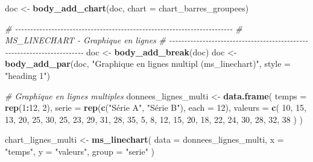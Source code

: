 \documentclass[
]{article}
\newenvironment{Shaded}{\begin{snugshade}}{\end{snugshade}}
\newcommand{\AttributeTok}[1]{\textcolor[rgb]{0.13,0.29,0.53}{#1}}
\newcommand{\CommentTok}[1]{\textcolor[rgb]{0.56,0.35,0.01}{\textit{#1}}}
\newcommand{\DecValTok}[1]{\textcolor[rgb]{0.00,0.00,0.81}{#1}}
\newcommand{\FunctionTok}[1]{\textcolor[rgb]{0.13,0.29,0.53}{\textbf{#1}}}
\newcommand{\NormalTok}[1]{#1}
\newcommand{\OtherTok}[1]{\textcolor[rgb]{0.56,0.35,0.01}{#1}}
\newcommand{\SpecialCharTok}[1]{\textcolor[rgb]{0.81,0.36,0.00}{\textbf{#1}}}
\newcommand{\StringTok}[1]{\textcolor[rgb]{0.31,0.60,0.02}{#1}}
\begin{document}
\begin{Shaded}
\begin{Highlighting}[]
\NormalTok{doc }\OtherTok{\textless{}{-}} \FunctionTok{body\_add\_chart}\NormalTok{(doc, }\AttributeTok{chart =}\NormalTok{ chart\_barres\_groupees)}

\CommentTok{\# {-}{-}{-}{-}{-}{-}{-}{-}{-}{-}{-}{-}{-}{-}{-}{-}{-}{-}{-}{-}{-}{-}{-}{-}{-}{-}{-}{-}{-}{-}{-}{-}{-}{-}{-}{-}{-}{-}{-}{-}{-}{-}{-}{-}{-}{-}{-}{-}{-}{-}{-}{-}{-}{-}{-}{-}{-}{-}{-}{-}{-}{-}{-}{-}{-}{-}{-}{-}{-}{-}{-}{-}}
\CommentTok{\# MS\_LINECHART {-} Graphique en lignes}
\CommentTok{\# {-}{-}{-}{-}{-}{-}{-}{-}{-}{-}{-}{-}{-}{-}{-}{-}{-}{-}{-}{-}{-}{-}{-}{-}{-}{-}{-}{-}{-}{-}{-}{-}{-}{-}{-}{-}{-}{-}{-}{-}{-}{-}{-}{-}{-}{-}{-}{-}{-}{-}{-}{-}{-}{-}{-}{-}{-}{-}{-}{-}{-}{-}{-}{-}{-}{-}{-}{-}{-}{-}{-}{-}}
\NormalTok{doc }\OtherTok{\textless{}{-}} \FunctionTok{body\_add\_break}\NormalTok{(doc)}
\NormalTok{doc }\OtherTok{\textless{}{-}} \FunctionTok{body\_add\_par}\NormalTok{(doc, }\StringTok{"Graphique en lignes multipl (ms\_linechart)"}\NormalTok{, }\AttributeTok{style =} \StringTok{"heading 1"}\NormalTok{)}

\CommentTok{\# Graphique en lignes multiples}
\NormalTok{donnees\_lignes\_multi }\OtherTok{\textless{}{-}} \FunctionTok{data.frame}\NormalTok{(}
  \AttributeTok{temps =} \FunctionTok{rep}\NormalTok{(}\DecValTok{1}\SpecialCharTok{:}\DecValTok{12}\NormalTok{, }\DecValTok{2}\NormalTok{),}
  \AttributeTok{serie =} \FunctionTok{rep}\NormalTok{(}\FunctionTok{c}\NormalTok{(}\StringTok{"Série A"}\NormalTok{, }\StringTok{"Série B"}\NormalTok{), }\AttributeTok{each =} \DecValTok{12}\NormalTok{),}
  \AttributeTok{valeurs =} \FunctionTok{c}\NormalTok{(}
    \DecValTok{10}\NormalTok{, }\DecValTok{15}\NormalTok{, }\DecValTok{13}\NormalTok{, }\DecValTok{20}\NormalTok{, }\DecValTok{25}\NormalTok{, }\DecValTok{30}\NormalTok{, }\DecValTok{25}\NormalTok{, }\DecValTok{23}\NormalTok{, }\DecValTok{29}\NormalTok{, }\DecValTok{31}\NormalTok{, }\DecValTok{28}\NormalTok{, }\DecValTok{35}\NormalTok{,}
    \DecValTok{5}\NormalTok{, }\DecValTok{8}\NormalTok{, }\DecValTok{12}\NormalTok{, }\DecValTok{15}\NormalTok{, }\DecValTok{20}\NormalTok{, }\DecValTok{18}\NormalTok{, }\DecValTok{22}\NormalTok{, }\DecValTok{24}\NormalTok{, }\DecValTok{30}\NormalTok{, }\DecValTok{28}\NormalTok{, }\DecValTok{32}\NormalTok{, }\DecValTok{38}
\NormalTok{  )}
\NormalTok{)}

\NormalTok{chart\_lignes\_multi }\OtherTok{\textless{}{-}} \FunctionTok{ms\_linechart}\NormalTok{(}
  \AttributeTok{data =}\NormalTok{ donnees\_lignes\_multi,}
  \AttributeTok{x =} \StringTok{"temps"}\NormalTok{,}
  \AttributeTok{y =} \StringTok{"valeurs"}\NormalTok{,}
  \AttributeTok{group =} \StringTok{"serie"}
\NormalTok{)}



\end{Highlighting}
\end{Shaded}
\end{document}
